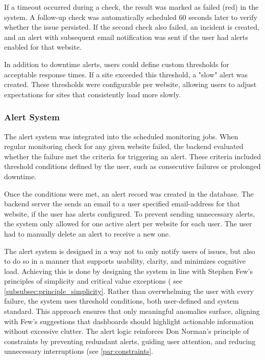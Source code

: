 If a timeout occurred during a check, the result was marked as failed (red) in the system. A follow-up check was automatically scheduled 60 seconds later to verify whether the issue persisted. If the second check also failed, an incident is created, and an alert with subsequent email notification was sent if the user had alerts enabled for that website.

In addition to downtime alerts, users could define custom thresholds for acceptable response times. If a site exceeded this threshold, a "slow" alert was created. These thresholds were configurable per website, allowing users to adjust expectations for sites that consistently load more slowly.

\subsubsection{Alert System}

The alert system was integrated into the scheduled monitoring jobs. When regular monitoring check for any given website failed, the backend evaluated whether the failure met the criteria for triggering an alert. These criteria included threshold conditions defined by the user, such as consecutive failures or prolonged downtime.

Once the conditions were met, an alert record was created in the database. 
The backend server the  sends an email to a user specified email-address for that website, if the user has alerts configured. To prevent sending unnecessary alerts, the system only allowed for one active alert per website for each user. The user had to manually delete an alert to receive a new one.


The alert system is designed in a way not to only notify users of issues, but also to do so in a manner that supports usability, clarity, and minimizes cognitive load. Achieving this is done by designing the system in line with Stephen Few's principles of simplicity and critical value exceptions ( see \autoref{subsubsec:principle_simplicity}. Rather than overwhelming the user with every failure, the system uses threshold conditions, both user-defined and system standard. This approach ensures that only meaningful anomalies surface, aligning with Few's suggestions that dashboards should highlight actionable information without excessive clutter. The alert logic reinforces Don Norman's principle of constraints by preventing redundant alerts, guiding user attention, and reducing unnecessary interruptions (see \autoref{par:constraints}. 

